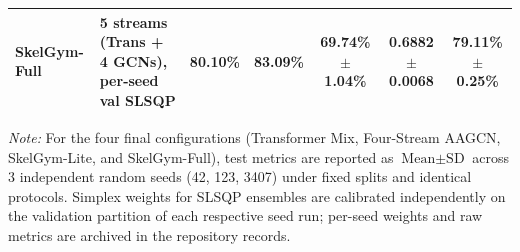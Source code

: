 \documentclass[runningheads]{llncs}
\begin{document}
\begin{table}[!t]
{\begin{tabular}{l l c c | c c c}
\textbf{SkelGym-Full}       & 5 streams (Trans + 4 GCNs), per-seed val SLSQP & \textbf{80.10\%} & \textbf{83.09\%} & \textbf{69.74\% $\pm$ 1.04\%} & \textbf{0.6882 $\pm$ 0.0068} & \textbf{79.11\% $\pm$ 0.25\%} \\
\bottomrule
\end{tabular}
}
\vspace{1mm}
\footnotesize{\textit{Note:} For the four final configurations (Transformer Mix, Four-Stream AAGCN, SkelGym-Lite, and SkelGym-Full), test metrics are reported as $\text{Mean} \pm \text{SD}$ across 3 independent random seeds (42, 123, 3407) under fixed splits and identical protocols. Simplex weights for SLSQP ensembles are calibrated independently on the validation partition of each respective seed run; per-seed weights and raw metrics are archived in the repository records.}
\end{table}
\end{document}
